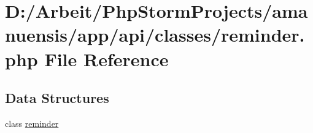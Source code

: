 \hypertarget{a00073}{}\section{D\+:/\+Arbeit/\+Php\+Storm\+Projects/amanuensis/app/api/classes/reminder.php File Reference}
\label{a00073}
\subsection*{Data Structures}
\begin{DoxyCompactItemize}
\item 
class \hyperlink{a00039}{reminder}
\end{DoxyCompactItemize}
